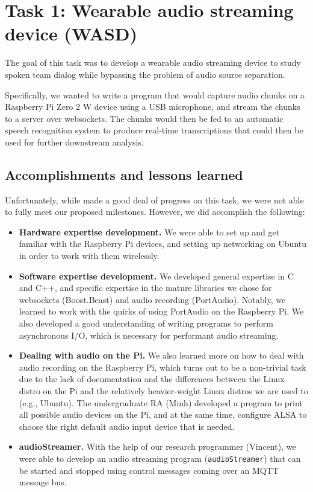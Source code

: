 \section{Task 1: Wearable audio streaming device (WASD)}
\label{sec:wasd}

The goal of this task was to develop a wearable audio streaming device to
study spoken team dialog while bypassing the problem of audio source
separation.

Specifically, we wanted to write a program that would capture audio chunks on a
Raspberry Pi Zero 2 W device using a USB microphone, and stream the chunks to a
server over websockets. The chunks would then be fed to an automatic speech
recognition system to produce real-time transcriptions that could then be used
for further downstream analysis.

\subsection{Accomplishments and lessons learned}

Unfortunately, while made a good deal of progress on this task, we were not
able to fully meet our proposed milestones. However, we did accomplish the
following:


\begin{itemize}

    \item \textbf{Hardware expertise development.} We were able to set up and
        get familiar with the Raspberry Pi devices, and setting up networking
        on Ubuntu in order to work with them wirelessly.

    \item \textbf{Software expertise development.} We developed general
        expertise in C and C++, and specific expertise in the mature libraries
        we chose for websockets (Boost.Beast) and audio recording (PortAudio).
        Notably, we learned to work with the quirks of using PortAudio on the
        Raspberry Pi.  We also developed a good understanding of writing
        programs to perform asynchronous I/O, which is necessary for performant
        audio streaming.

    \item \textbf{Dealing with audio on the Pi.} We also learned more on how to
        deal with audio recording on the Raspberry Pi, which turns out to be a
        non-trivial task due to the lack of documentation and the differences
        between the Linux distro on the Pi and the relatively heavier-weight
        Linux distros we are used to (e.g., Ubuntu).
        The undergraduate RA (Minh) developed a program to print all possible audio
        devices on the Pi, and at the same time, configure ALSA to choose the
        right default audio input device that is needed.

    \item \textbf{audioStreamer.} With the help of our research programmer
        (Vincent), we were able to develop an audio streaming program
        (\texttt{audioStreamer}) that can be started and stopped using control
        messages coming over an MQTT message bus. 

\end{itemize}

